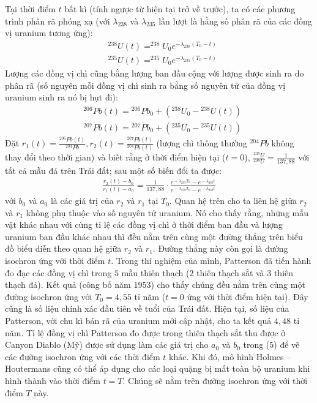 \begin{multicols}{2}
	\vskip 0.1cm
	Tại thời điểm $t$ bất kì (tính ngược từ hiện tại trở về trước), ta có các phương trình phân rã phóng xạ (với $\lambda_{238}$ và $\lambda_{235}$ lần lượt là hằng số phân rã của các đồng vị uranium tương ứng):
	\begin{align*}
		&^{238}U(t) = ^{238}U_0e^{-\lambda_{238}(T_0 -t)} \tag{$1$}\\
		&^{235}U(t) = ^{235}U_0e^{-\lambda_{235}(T_0 -t)} \tag{$2$}
	\end{align*}
	Lượng các đồng vị chì cũng bằng lượng ban đầu cộng với lượng được sinh ra do phân rã (số nguyên mỗi đồng vị chì sinh ra bằng số nguyên tử của đồng vị uranium sinh ra nó bị hụt đi):
	\begin{align*}
		&^{206}\!Pb(t) \!=\! ^{206}\!Pb_0 \!+\! \left(^{238}\!U_0 \!-\! ^{238}\!U(t)\right) \tag{$3$}\\
		&^{207}\!Pb(t) \!=\! ^{207}\!Pb_0 \!+\! \left(^{235}\!U_0 \!-\! ^{235}\!U(t)\right) \tag{$4$}
	\end{align*}
	Đặt $r_1 (t)= \frac{^{206}Pb(t)}{^{204}Pb},r_2 (t)= \frac{^{207}Pb(t)}{^{204}Pb(t)}$ (lượng chì thông thường $^{204}Pb$ không thay đổi theo thời gian) và biết rằng ở thời điểm hiện tại ($t=0$), $\frac{^{235}U}{^{238}U} = \frac{1}{137,88}$ với tất cả mẫu đá trên Trái đất; sau một số biến đổi ta được:
	\begin{align*}
		\frac{r_2(t) \!-\! b_0}{r_1(t)\!-\! a_0} \!=\! \frac{1}{137{,}88} \!\cdot\! \frac{e^{\!-\!\lambda_{235}T_0}\!-\! e^{\!-\!\lambda_{235}t}}{e^{\!-\!\lambda_{238}T_0}\!-\! e^{\!-\!\lambda_{238}t}} \tag{$5$}
	\end{align*}
	với $b_0$ và $a_0$ là các giá trị của $r_2$ và $r_1$ tại $T_0$.
	\vskip 0.1cm
	Quan hệ trên cho ta liên hệ giữa $r_2$ và $r_1$ không phụ thuộc vào số nguyên tử uranium. Nó cho thấy rằng, những mẫu vật khác nhau với cùng tỉ lệ các đồng vị chì ở thời điểm ban đầu và lượng uranium ban đầu khác nhau thì đều nằm trên cùng một đường thẳng trên biểu đồ biểu diễn theo quan hệ giữa $r_2$ và $r_1$. Đường thẳng này còn gọi là đường isochron ứng với thời điểm $t$.
	\vskip 0.1cm
	Trong thí nghiệm của mình, Patterson đã tiến hành đo đạc các đồng vị chì trong $5$ mẫu thiên thạch ($2$ thiên thạch sắt và $3$ thiên thạch đá). Kết quả (công bố năm $1953$) cho thấy chúng đều nằm trên cùng một đường isochron ứng với $T_0=4,55$ tỉ năm ($t=0$ ứng với thời điểm hiện tại). Đây cũng là số liệu chính xác đầu tiên về tuổi của Trái đất. Hiện tại, số liệu của Patterson, với chu kì bán rã của uranium mới cập nhật, cho ta kết quả $4,48$ tỉ năm. Tỉ lệ đồng vị chì Patterson đo được trong thiên thạch sắt thu được ở Canyon Diablo (Mỹ) được sử dụng làm các giá trị cho $a_0$ và $b_0$ trong ($5$) để vẽ các đường isochron ứng với các thời điểm $t$ khác. Khi đó, mô hình Holmes -- Houtermans cũng có thể áp dụng cho các loại quặng bị mất toàn bộ uranium khi hình thành vào thời điểm $t=T$. Chúng sẽ nằm trên đường isochron ứng với thời điểm $T$ này.

\end{multicols}
